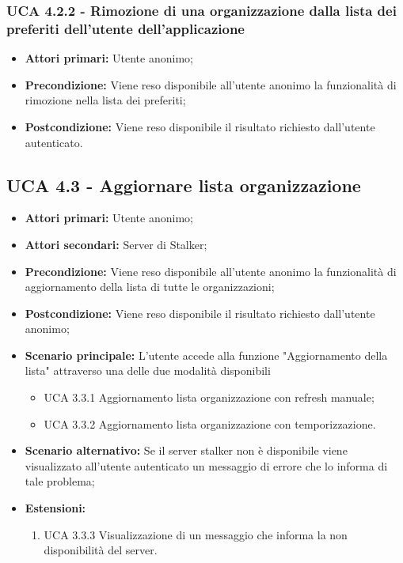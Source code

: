 \subsubsection{UCA 4.2.2 - Rimozione di una organizzazione dalla lista dei preferiti dell’utente dell’applicazione}%
\begin{itemize}
	\item \textbf{Attori primari:} Utente anonimo;
	\item \textbf{Precondizione:} Viene reso disponibile all’utente anonimo la funzionalità di rimozione nella lista dei preferiti;
	\item \textbf{Postcondizione:} Viene reso disponibile il risultato richiesto dall’utente autenticato.
\end{itemize}

\subsection{UCA 4.3 - Aggiornare lista organizzazione}%
\begin{itemize} 
	\item \textbf{Attori primari:} Utente anonimo;
	\item \textbf{Attori secondari:} Server di Stalker;
	\item \textbf{Precondizione:} Viene reso disponibile all’utente anonimo la funzionalità di aggiornamento della lista di tutte le organizzazioni;
	\item \textbf{Postcondizione:} Viene reso disponibile il risultato richiesto dall’utente anonimo;
	\item \textbf{Scenario principale:}  L’utente accede alla funzione "Aggiornamento della lista" attraverso una delle due modalità disponibili
	\begin{itemize}
		\item UCA 3.3.1 Aggiornamento lista organizzazione con refresh manuale;
		\item UCA 3.3.2 Aggiornamento lista organizzazione con temporizzazione.
	\end{itemize}
	\item \textbf{Scenario alternativo:} Se il server stalker non è disponibile viene visualizzato all’utente autenticato un messaggio di errore che lo informa di tale problema;
	\item \textbf{Estensioni:}
	\begin{enumerate}
		\item UCA 3.3.3 Visualizzazione di un messaggio che informa la non disponibilità del server.
	\end{enumerate}
\end{itemize}

